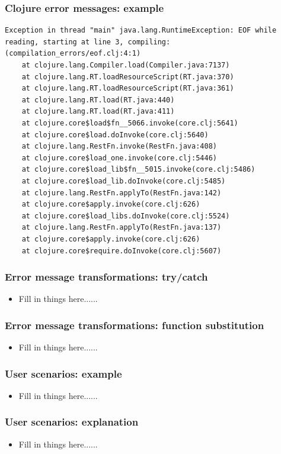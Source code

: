 \documentclass{beamer}
\begin{document}
\begin{frame}[fragile]
\frametitle{Clojure error messages: example}

\begin{verbatim}
Exception in thread "main" java.lang.RuntimeException: EOF while reading, starting at line 3, compiling:(compilation_errors/eof.clj:4:1)
	at clojure.lang.Compiler.load(Compiler.java:7137)
	at clojure.lang.RT.loadResourceScript(RT.java:370)
	at clojure.lang.RT.loadResourceScript(RT.java:361)
	at clojure.lang.RT.load(RT.java:440)
	at clojure.lang.RT.load(RT.java:411)
	at clojure.core$load$fn__5066.invoke(core.clj:5641)
	at clojure.core$load.doInvoke(core.clj:5640)
	at clojure.lang.RestFn.invoke(RestFn.java:408)
	at clojure.core$load_one.invoke(core.clj:5446)
	at clojure.core$load_lib$fn__5015.invoke(core.clj:5486)
	at clojure.core$load_lib.doInvoke(core.clj:5485)
	at clojure.lang.RestFn.applyTo(RestFn.java:142)
	at clojure.core$apply.invoke(core.clj:626)
	at clojure.core$load_libs.doInvoke(core.clj:5524)
	at clojure.lang.RestFn.applyTo(RestFn.java:137)
	at clojure.core$apply.invoke(core.clj:626)
	at clojure.core$require.doInvoke(core.clj:5607)
\end{verbatim}

\end{frame}

\begin{frame}
\frametitle{Error message transformations: try/catch}
	\begin{itemize}
  	 \item Fill in things here......
	 \end{itemize}
\end{frame}

\begin{frame}
\frametitle{Error message transformations: function substitution}
	\begin{itemize}
  	 \item Fill in things here......
	 \end{itemize}
\end{frame}

\begin{frame}[fragile]
\frametitle{User scenarios: example}
	\begin{itemize}
  	 \item Fill in things here......
	 \end{itemize}
\end{frame}

\begin{frame}
\frametitle{User scenarios: explanation}
	\begin{itemize}
  	 \item Fill in things here......
	 \end{itemize}
\end{frame}
\end{document}
